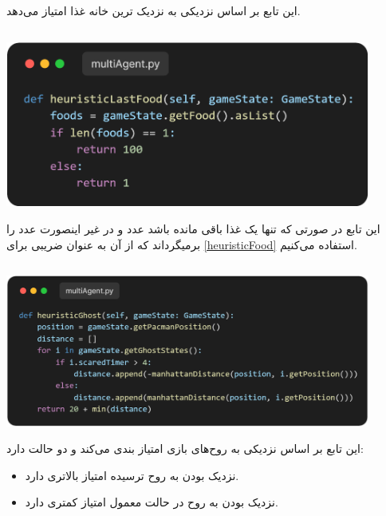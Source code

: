 \documentclass[12pt, dvipsnames, svgnames, x11names,]{article}
\begin{document}
			{\normalsize این تابع بر اساس نزدیکی  به نزدیک ترین خانه غذا امتیاز می‌دهد.}
			
			
		\subsection{}
		
			\begin{center}
				\includegraphics[width=12cm]{images/02}
			\end{center}
			
			{\normalsize این تابع در صورتی که تنها یک غذا باقی مانده باشد عدد  و در غیر اینصورت عدد  را برمیگرداند که از آن به عنوان ضریبی برای \ref{heuristicFood} استفاده می‌کنیم.}
	
	
		\subsection{}
		
			\begin{center}
				\includegraphics[width=12cm]{images/03}
			\end{center}
			
			{\normalsize این تابع بر اساس نزدیکی به روح‌های بازی امتیاز بندی می‌کند و دو حالت دارد:}
			
			\begin{itemize}
				\item {\small نزدیک بودن به روح ترسیده امتیاز بالاتری دارد.}
				
				\item {\small نزدیک بودن به روح در حالت معمول امتیاز کمتری دارد.}
			\end{itemize}
			
\end{document}
